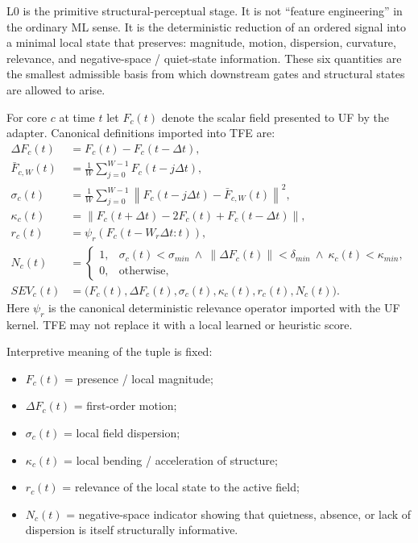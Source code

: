 L0 is the primitive structural-perceptual stage. It is not ``feature engineering'' in the ordinary ML sense. It is the deterministic reduction of an ordered signal into a minimal local state that preserves: magnitude, motion, dispersion, curvature, relevance, and negative-space / quiet-state information. These six quantities are the smallest admissible basis from which downstream gates and structural states are allowed to arise.

For core $c$ at time $t$ let $F_c(t)$ denote the scalar field presented to UF by the adapter. Canonical definitions imported into TFE are:
\begin{align*}
\Delta F_c(t) &= F_c(t)-F_c(t-\Delta t),\\
\bar F_{c,W}(t) &= \frac{1}{W}\sum_{j=0}^{W-1}F_c(t-j\Delta t),\\
\sigma_c(t) &= \frac{1}{W}\sum_{j=0}^{W-1}\left\lVert F_c(t-j\Delta t)-\bar F_{c,W}(t)\right\rVert^2,\\
\kappa_c(t) &= \left\lVert F_c(t+\Delta t)-2F_c(t)+F_c(t-\Delta t)\right\rVert,\\
r_c(t) &= \psi_r\!\left(F_c(t-W_r\Delta t:t)\right),\\
N_c(t) &= \begin{cases}
1, & \sigma_c(t)<\sigma_{min}\ \wedge\ \lVert\Delta F_c(t)\rVert<\delta_{min}\ \wedge\ \kappa_c(t)<\kappa_{min},\\
0, & \text{otherwise,}
\end{cases}\\
SEV_c(t) &= \big(F_c(t),\Delta F_c(t),\sigma_c(t),\kappa_c(t),r_c(t),N_c(t)\big).
\end{align*}
Here $\psi_r$ is the canonical deterministic relevance operator imported with the UF kernel. TFE may not replace it with a local learned or heuristic score.

Interpretive meaning of the tuple is fixed:
\begin{itemize}
    \item $F_c(t)$ = presence / local magnitude;
    \item $\Delta F_c(t)$ = first-order motion;
    \item $\sigma_c(t)$ = local field dispersion;
    \item $\kappa_c(t)$ = local bending / acceleration of structure;
    \item $r_c(t)$ = relevance of the local state to the active field;
    \item $N_c(t)$ = negative-space indicator showing that quietness, absence, or lack of dispersion is itself structurally informative.
\end{itemize}

